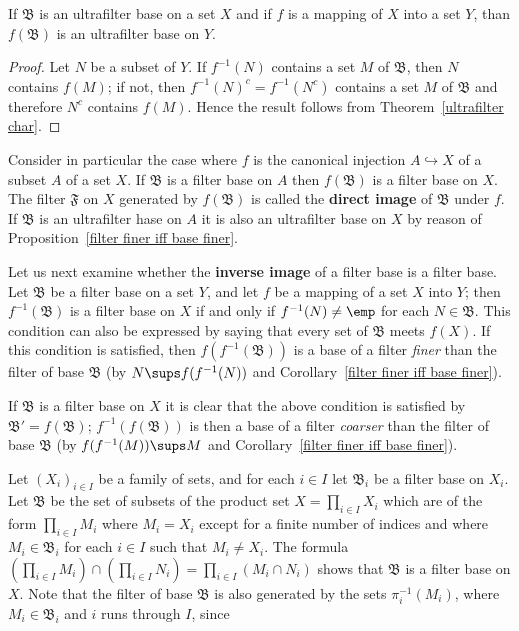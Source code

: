 \begin{proposition}
If $\mathfrak{B}$ is an ultrafilter base on a set $X$ and if $f$ is a mapping of $X$ into a set $Y$, than $f(\mathfrak{B})$ is an ultrafilter base on $Y$.
\end{proposition}
\begin{proof}
Let $N$ be a subset of $Y$. If $f^{-1}(N)$ contains a set $M$ of $\mathfrak{B}$, then $N$ contains $f(M)$; if not, then $f^{-1}(N)^c=f^{-1}(N^c)$ contains a set $M$ of $\mathfrak{B}$ and therefore $N^c$ contains $f(M)$. Hence the result follows from Theorem~\ref{ultrafilter char}.
\end{proof}
Consider in particular the case where $f$ is the canonical injection $A\hookrightarrow X$ of a subset $A$ of a set $X$. If $\mathfrak{B}$ is a filter base on $A$ then $f(\mathfrak{B})$ is a filter base on $X$. The filter $\mathfrak{F}$ on $X$ generated by $f(\mathfrak{B})$ is called the \textbf{direct image} of $\mathfrak{B}$ under $f$. If $\mathfrak{B}$ is an ultrafilter hase on $A$ it is also an ultrafilter base on $X$ by reason of Proposition~\ref{filter finer iff base finer}.\par
Let us next examine whether the \textbf{inverse image} of a filter base is a filter base. Let $\mathfrak{B}$ be a filter base on a set $Y$, and let $f$ be a mapping of a set $X$ into $Y$; then $f^{-1}(\mathfrak{B})$ is a filter base on $X$ if and only if $f^{-1}(N)\neq\emp$ for each $N\in\mathfrak{B}$. This condition can also be expressed by saying that every set of $\mathfrak{B}$ meets $f(X)$. If this condition is satisfied, then $f(f^{-1}(\mathfrak{B}))$ is a base of a filter \textit{finer} than the filter of base $\mathfrak{B}$ (by $N\sups f(f^{-1}(N))$ and Corollary~\ref{filter finer iff base finer}).\par
If $\mathfrak{B}$ is a filter base on $X$ it is clear that the above condition is satisfied by $\mathfrak{B}'=f(\mathfrak{B})$; $f^{-1}(f(\mathfrak{B}))$ is then a base of a filter \textit{coarser} than the filter of base $\mathfrak{B}$ (by $f(f^{-1}(M))\sups M$ and Corollary~\ref{filter finer iff base finer}).\par
Let $(X_i)_{i\in I}$ be a family of sets, and for each $i\in I$ let $\mathfrak{B}_i$ be a filter base on $X_i$. Let $\mathfrak{B}$ be the set of subsets of the product set $X=\prod_{i\in I}X_i$ which are of the form $\prod_{i\in I}M_i$ where $M_i=X_i$ except for a finite number of indices and where $M_i\in\mathfrak{B}_i$ for each $i\in I$ such that $M_i\neq X_i$. The formula $(\prod_{i\in I}M_i)\cap(\prod_{i\in I}N_i)=\prod_{i\in I}(M_i\cap N_i)$ shows that $\mathfrak{B}$ is a filter base on $X$. Note that the filter of base $\mathfrak{B}$ is also generated by the sets $\pi_i^{-1}(M_i)$, where $M_i\in\mathfrak{B}_i$ and $i$ runs through $I$, since
